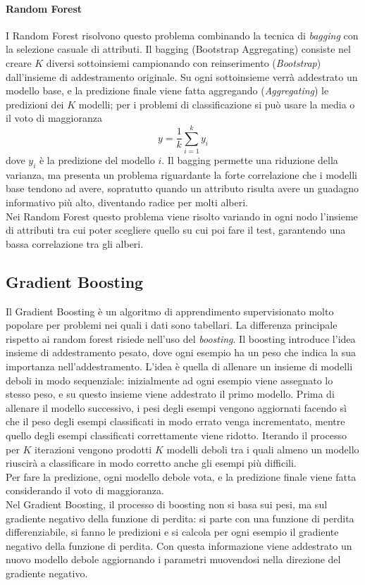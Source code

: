 \paragraph{Random Forest}
I Random Forest \cite{breiman2001random} risolvono questo problema  combinando la tecnica di \textit{bagging} con la selezione casuale di attributi.
Il bagging (Bootstrap Aggregating) consiste nel creare $K$ diversi sottoinsiemi campionando con reinserimento (\textit{Bootstrap}) dall'insieme di addestramento originale. Su ogni sottoinsieme verrà addestrato un modello base, e la predizione finale viene fatta aggregando (\textit{Aggregating}) le predizioni dei $K$ modelli; per i problemi di classificazione si può usare la media o il voto di maggioranza
\begin{equation}
    y = \frac{1}{k}\sum_{i=1}^{k} y_i
\end{equation}
dove $y_i$ è la predizione del modello $i$. Il bagging permette una riduzione della varianza, ma presenta un problema riguardante la forte correlazione che i modelli base tendono ad avere, sopratutto quando un attributo risulta avere un guadagno informativo più alto, diventando radice per molti alberi.\\
Nei Random Forest questo problema viene risolto variando in ogni nodo l'insieme di attributi tra cui poter scegliere quello su cui poi fare il test, garantendo una bassa correlazione tra gli alberi.
\subsection{Gradient Boosting}
Il Gradient Boosting è un algoritmo di apprendimento supervisionato molto popolare per problemi nei quali i dati sono tabellari. La differenza principale rispetto ai random forest risiede nell'uso del \textit{boosting}.
Il boosting introduce l'idea insieme di addestramento pesato, dove ogni esempio ha un peso che indica la sua importanza nell'addestramento. L'idea è quella di allenare un insieme di modelli deboli in modo sequenziale: inizialmente ad ogni esempio viene assegnato lo stesso peso, e su questo insieme viene addestrato il primo modello. Prima di allenare il modello successivo, i pesi degli esempi vengono aggiornati facendo sì che il peso degli esempi classificati in modo errato venga incrementato, mentre quello degli esempi classificati correttamente viene ridotto. Iterando il processo per $K$ iterazioni vengono prodotti $K$ modelli deboli tra i quali almeno un modello riuscirà a classificare in modo corretto anche gli esempi più difficili.\\
Per fare la predizione, ogni modello debole vota, e la predizione finale viene fatta considerando il voto di maggioranza.\\
Nel Gradient Boosting, il processo di boosting non si basa sui pesi, ma sul gradiente negativo della funzione di perdita: si parte con una funzione di perdita differenziabile, si fanno le predizioni e si calcola per ogni esempio il gradiente negativo della funzione di perdita. Con questa informazione viene addestrato un nuovo modello debole aggiornando i parametri muovendosi nella direzione del gradiente negativo. 
